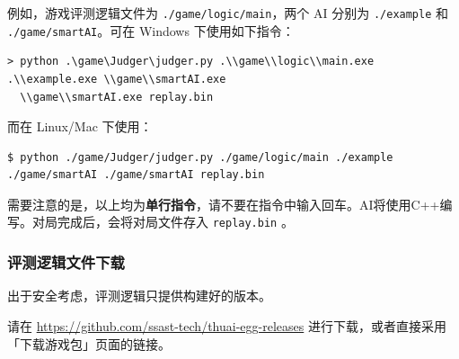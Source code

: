 \documentclass[UTF8]{article}
\begin{document}
例如，游戏评测逻辑文件为 \texttt{./game/logic/main}，两个 AI 分别为
\texttt{./example} 和 \texttt{./game/smartAI}。可在 Windows
下使用如下指令：

\begin{verbatim}
> python .\game\Judger\judger.py .\\game\\logic\\main.exe .\\example.exe \\game\\smartAI.exe
  \\game\\smartAI.exe replay.bin
\end{verbatim}

而在 Linux/Mac 下使用：

\begin{verbatim}
$ python ./game/Judger/judger.py ./game/logic/main ./example ./game/smartAI ./game/smartAI replay.bin
\end{verbatim}

需要注意的是，以上均为\textbf{单行指令}，请不要在指令中输入回车。AI将使用C++编写。对局完成后，会将对局文件存入 \texttt{replay.bin} 。

\hypertarget{header-n58}{%
\subsubsection{评测逻辑文件下载}\label{header-n58}}

出于安全考虑，评测逻辑只提供构建好的版本。\par 请在
\url{https://github.com/ssast-tech/thuai-egg-releases}
进行下载，或者直接采用「下载游戏包」页面的链接。
\end{document}
